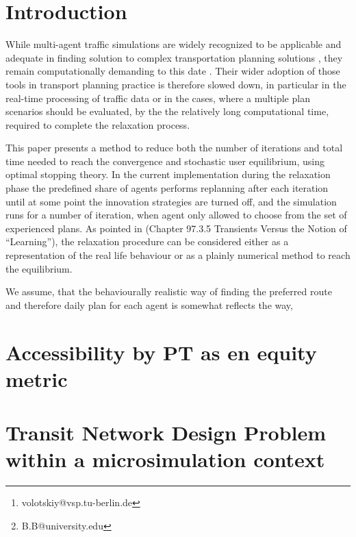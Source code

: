 \documentclass[10pt]{article}
\author[1, 2]{Timofey Volotskiy\thanks{volotskiy@vsp.tu-berlin.de}}
\author[2]{Jaroslav Smirnov \thanks{B.B@university.edu}}
\affil[1]{Institute of urban studies and design, ITMO University}
\affil[2]{Transport Systems Planning and Transport Telematics, Technische Universität Berlin}
\begin{document}
\maketitle

\begin{abstract}
	(Write abstract...)
\end{abstract}

\section{Introduction}
While multi-agent traffic simulations are widely recognized to be applicable and adequate in finding solution to complex transportation planning solutions \cite{Flugel2014b}, they remain computationally demanding to this date \cite{Balmer2008}. Their wider adoption of those tools in transport planning practice is therefore slowed down, in particular in the real-time processing of traffic data or in the cases, where a multiple plan scenarios should be evaluated, by the the relatively long computational time, required to complete the relaxation process. 

This paper presents a method to reduce both the number of iterations and total time needed to reach the convergence and stochastic user equilibrium, using optimal stopping theory. 
In the current implementation during the relaxation phase the predefined share of agents performs replanning after each iteration until at some point the innovation strategies are turned off, and the simulation runs for a number of iteration, when agent only allowed to choose from the set of experienced plans. As pointed in \cite{Horni2016a} (Chapter 97.3.5 Transients Versus the Notion of “Learning”), the relaxation procedure can be considered either as a representation of the real life behaviour or as a plainly numerical method to reach the equilibrium. 

We assume, that the behaviourally realistic way of finding the preferred route and therefore daily plan for each agent is somewhat reflects the way, 



\section{Accessibility by PT as en equity metric}
\section{Transit Network Design Problem within a microsimulation context}
\end{document}
